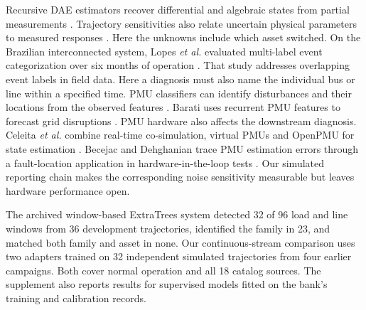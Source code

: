 Recursive DAE estimators recover differential and algebraic states from
partial measurements \cite{katanic2024recursive}. Trajectory sensitivities
also relate uncertain physical parameters to measured responses
\cite{nagi2022trajectory}. Here the unknowns include which asset switched.
On the Brazilian interconnected system, Lopes \emph{et al.} evaluated
multi-label event categorization over six months of operation
\cite{lopes2025multilabel}. That study addresses overlapping event labels
in field data. Here a diagnosis must also name the individual bus or line
within a specified time.
PMU classifiers can identify disturbances and their locations from
the observed features \cite{pandey2020realtime,li2024knowledge,yildiz2024few}.
Barati uses recurrent PMU features to forecast grid disruptions
\cite{barati2019faster}. PMU hardware also affects the downstream diagnosis. Celeita \emph{et al.} combine real-time co-simulation,
virtual PMUs and OpenPMU for state estimation \cite{celeita2023iec61850}.
Becejac and Dehghanian trace PMU estimation errors through a fault-location
application in hardware-in-the-loop tests \cite{becejac2019pmu}.
Our simulated reporting chain makes the corresponding noise sensitivity
measurable but leaves hardware performance open.

The archived window-based ExtraTrees system detected 32 of 96 load and line
windows from 36 development trajectories, identified the family in 23,
and matched both family and asset in none. Our continuous-stream comparison
uses two adapters trained on 32 independent simulated trajectories from
four earlier campaigns. Both cover normal operation and all 18 catalog
sources. The supplement also reports results for supervised models fitted
on the bank's training and calibration records.
